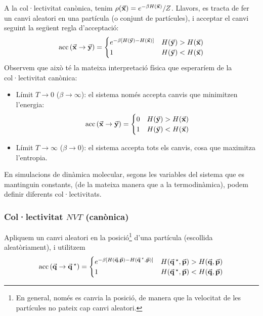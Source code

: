 \begin{example}
	A la col·lectivitat canònica, tenim $\rho(\va{x}) = e^{- \beta H(\va{x})}/Z$. Llavors, es tracta de fer un canvi aleatori en una partícula (o conjunt de partícules), i acceptar el canvi seguint la següent regla d'acceptació:
	\begin{align*}
		\operatorname{acc}\qty(\va{x} \to \va{y}) =
		\begin{cases}
			e^{- \beta \qty[H(\va{y}) - H(\va{x})]} & H(\va{y}) > H(\va{x}) \\
			1                                       & H(\va{y}) < H(\va{x})
		\end{cases}
	\end{align*}
	Observem que això té la mateixa interpretació física que esperaríem de la col·lectivitat canònica:
	\begin{itemize}
		\item Límit $T \to 0$ ($\beta \to \infty$): el sistema només accepta canvis que minimitzen l'energia:
		\begin{align*}
			\operatorname{acc}\qty(\va{x} \to \va{y}) =
			\begin{cases}
				0 & H(\va{y}) > H(\va{x}) \\
				1 & H(\va{y}) < H(\va{x})
			\end{cases}
		\end{align*}
		\item Límit $T \to \infty$ ($\beta \to 0$): el sistema accepta tots els canvis, cosa que maximitza l'entropia.
	\end{itemize}
\end{example}

En simulacions de dinàmica molecular, segons les variables del sistema que es mantinguin constants, (de la mateixa manera que a la termodinàmica), podem definir diferents col·lectivitats.

\subsubsection*{Col·lectivitat $NVT$ (canònica)}
Apliquem un canvi aleatori en la posició\footnote{En general, només es canvia la posició, de manera que la velocitat de les partícules no pateix cap canvi aleatori.} d'una partícula (escollida aleatòriament), i utilitzem
\begin{align}
	\operatorname{acc}\qty(\va{q} \to \va{q}\,^{\star}{}) =
	\begin{cases}
		e^{- \beta \qty[H(\va{q}, \va{p}) - H(\va{q}\,^{\star}{}, \va{p})]} & H(\va{q}\,^{\star}{}, \va{p}) > H(\va{q}, \va{p}) \\
		1 & H(\va{q}\,^{\star}{}, \va{p}) < H(\va{q}, \va{p})
	\end{cases}
\end{align}

